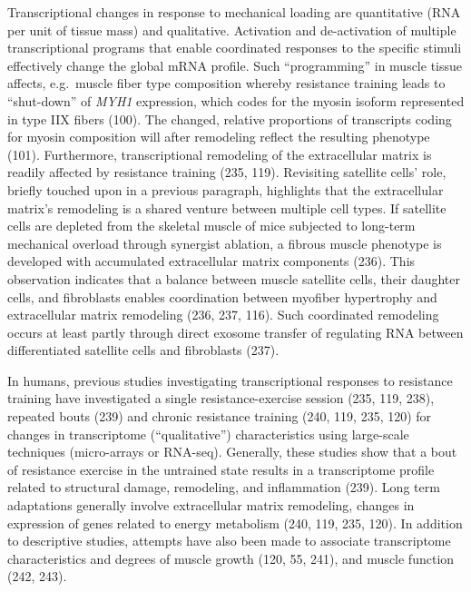 \documentclass[twoside,10pt]{gihclass} %
\begin{document}
Transcriptional changes in response to mechanical loading are quantitative (RNA per unit of tissue mass) and qualitative. Activation and de-activation of multiple transcriptional programs that enable coordinated responses to the specific stimuli effectively change the global mRNA profile.
Such ``programming'' in muscle tissue affects, e.g.~muscle fiber type composition whereby resistance training leads to ``shut-down'' of \emph{MYH1} expression, which codes for the myosin isoform represented in type IIX fibers
(100).
The changed, relative proportions of transcripts coding for myosin composition will after remodeling reflect the resulting phenotype
(101).
Furthermore, transcriptional remodeling of the extracellular matrix is readily affected by resistance training
(235, 119).
Revisiting satellite cells' role, briefly touched upon in a previous paragraph, highlights that the extracellular matrix's remodeling is a shared venture between multiple cell types.
If satellite cells are depleted from the skeletal muscle of mice subjected to long-term mechanical overload through synergist ablation, a fibrous muscle phenotype is developed with accumulated extracellular matrix components
(236).
This observation indicates that a balance between muscle satellite cells, their daughter cells, and fibroblasts enables coordination between myofiber hypertrophy and extracellular matrix remodeling
(236, 237, 116).
Such coordinated remodeling occurs at least partly through direct exosome transfer of regulating RNA between differentiated satellite cells and fibroblasts
(237).

In humans, previous studies investigating transcriptional responses to resistance training have investigated a single resistance-exercise session (235, 119, 238),
repeated bouts
(239)
and chronic resistance training (240, 119, 235, 120)
for changes in transcriptome (``qualitative'') characteristics using large-scale techniques (micro-arrays or RNA-seq).
Generally, these studies show that a bout of resistance exercise in the untrained state results in a transcriptome profile related to structural damage, remodeling, and inflammation
(239).
Long term adaptations generally involve extracellular matrix remodeling, changes in expression of genes related to energy metabolism
(240, 119, 235, 120).
In addition to descriptive studies, attempts have also been made to associate transcriptome characteristics and degrees of muscle growth
(120, 55, 241),
and muscle function
(242, 243).
\end{document}
